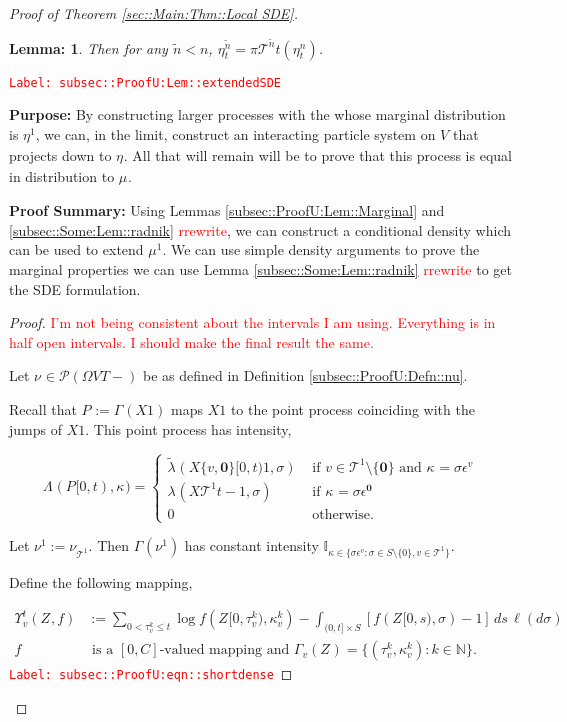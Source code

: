 \documentclass[12pt]{article}
\newcommand{\mb}{\mathbb}
\newcommand{\mc}{\mathcal}
\newcommand{\te}{\text}
\newcommand{\ep}{\epsilon}
\newcommand{\tr}{\textcolor{red}}
\newcommand{\labe}[1]{\tr{\texttt{Label: #1}}}
\newcommand{\purpose}{\textbf{Purpose: }}
\newcommand{\pfsum}{\textbf{Proof Summary: }}
\newcommand{\ind}{\hspace{24pt}}
\newcommand{\defeq}{:=}								%
\newcommand{\pmsr}{\mc{P}}							%
\renewcommand{\root}{\mathbf{0}}				%
\renewcommand{\v}{v}							%
\renewcommand{\S}{S}							%
\newcommand{\s}{\sigma}							%
\newcommand{\ev}[1]{\ep^{#1}}					%
\newcommand{\T}{T}								%
\renewcommand{\t}{t}							%
\newcommand{\proj}{\pi}							%
\renewcommand{\tt}{s}							%
\newcommand{\X}{X}								%
\newcommand{\const}{C}							%
\newcommand{\tree}{\mc{T}}						%
\newcommand{\sln}[1]{^{#1}}						%
\newcommand{\rt}[1]{\tau^{#1}}						%
\renewcommand{\it}{k}								%
\newcommand{\rxvttts}[2]{Z_{#1}{#2}}				%
\newcommand{\rp}[1]{P^{#1}}							%
\newcommand{\m}[3]{\mu_{#2#1}^{#3}}						%
\newcommand{\mm}[3]{\nu_{#2#1}^{#3}}						%
\newcommand{\mmm}[3]{\eta_{#2#1}^{#3}}						%
\newcommand{\rate}[1]{\lambda_{#1}}					%
\newcommand{\ratee}[1]{\Lambda_{#1}}				%
\newcommand{\crate}[2]{\alt{\lambda}_{#1}^{#2}}		%
\newcommand{\Sm}{\ell}								%
\newcommand{\alt}{\widetilde}						%
\renewcommand{\mark}[1]{\kappa^{#1}}				%
\newcommand{\ds}[2]{\Upsilon_{#1}^{#2}}			%
\newcommand{\pmap}[1]{\Gamma_{#1}}				%
\newtheorem{lem}[thms]{Lemma: }
\begin{document}
\begin{proof}[Proof of Theorem \ref{sec::Main:Thm::Local SDE}]
\begin{lem}
Then for any \(\alt{n} < n\), \(\mmm{}{\t}{\alt{n}} = \proj{\tree\sln{\alt{n}}}{\t}(\mmm{}{\t}{n})\).
\label{subsec::ProofU:Lem::extendedSDE}
\end{lem}
\labe{subsec::ProofU:Lem::extendedSDE}

\purpose By constructing larger processes with the whose marginal distribution is \(\mmm{}{}{1}\), we can, in the limit, construct an interacting particle system on \(V\) that projects down to \(\mmm{}{}{}\). All that will remain will be to prove that this process is equal in distribution to \(\m{}{}{}\).

\pfsum Using Lemmas \ref{subsec::ProofU:Lem::Marginal} and \ref{subsec::Some:Lem::radnik} \tr{rrewrite}, we can construct a conditional density which can be used to extend \(\mu\sln{1}\). We can use simple density arguments to prove the marginal properties we can use Lemma \ref{subsec::Some:Lem::radnik} \tr{rrewrite} to get the SDE formulation.

\begin{proof}
\tr{I'm not being consistent about the intervals I am using. Everything is in half open intervals. I should make the final result the same.}

Let \(\mm{}{}{} \in \pmsr(\Omega{ V}{\T-})\) be as defined in Definition \ref{subsec::ProofU:Defn::nu}.

\ind Recall that \(\rp{} \defeq \pmap{}(\X{}{}{1})\) maps \(\X{}{}{1}\) to the point process coinciding with the jumps of \(\X{}{}{1}\). This point process has intensity,

\[\ratee{}(\rp{}[0,\t),\mark{}) = \begin{cases}
\crate{}{}(\X{\{\v,\root\}}{[0,\t)}{1},\s) &\te{ if } \v\in \tree\sln{1}\setminus\{\root\}\te{ and } \mark{} = \s\ev{\v}\\
\rate{}(\X{\tree\sln{1}}{\t-}{1},\s) &\te{ if } \mark{} = \s\ev{\root}\\
0 &\te{ otherwise}.
\end{cases}\]

Let \(\mm{}{}{1} \defeq \mm{\tree\sln{1}}{}{}\). Then \(\pmap{}(\mm{}{}{1})\) has constant intensity \(\mb{I}_{\kappa \in\{\s\ev{\v}:\s\in\S\setminus\{0\},\v\in\tree\sln{1}\}}\). 

\ind Define the following mapping,

\begin{align}
\ds{\v}{\t}(\rxvttts{}{},f) &\defeq \sum_{0 < \rt{\it}_\v \leq \t} \log{f(\rxvttts{}{[0,\rt{\it}_\v)},\mark{\it}_\v)} - \int_{(0,\t]\times \S} [f(\rxvttts{}{[0,\tt)},\s) - 1]\,ds\,\Sm(d\s) \label{subsec::ProofU:eqn::shortdense}\\
f&\te{ is a }[0,\const{}] \te{-valued mapping and } \pmap{\v}(\rxvttts{}{}) = \{(\rt{\it}_\v,\mark{\it}_\v):\it\in\mb{N}\}.\nonumber
\end{align} 
\labe{subsec::ProofU:eqn::shortdense}


\end{proof}
\end{proof}
\end{document}

